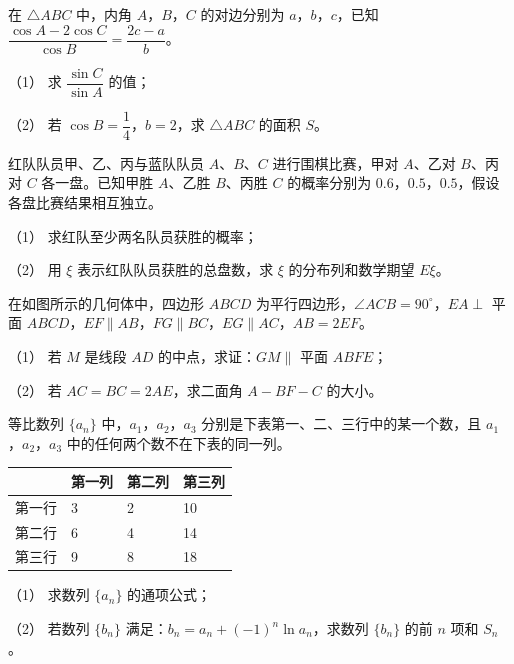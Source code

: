 \begin{question}
在 $\triangle ABC$ 中，内角 $A$，$B$，$C$ 的对边分别为 $a$，$b$，$c$，已知 $\dfrac{\cos A-2\cos C}{\cos B}=\dfrac{2c-a}{b}$。

（1） 求 $\dfrac{\sin C}{\sin A}$ 的值；

（2） 若 $\cos B=\dfrac14$，$b=2$，求 $\triangle ABC$ 的面积 $S$。

\end{question}
\begin{question}
红队队员甲、乙、丙与蓝队队员 $A$、$B$、$C$ 进行围棋比赛，甲对 $A$、乙对 $B$、丙对 $C$ 各一盘。已知甲胜 $A$、乙胜 $B$、丙胜 $C$ 的概率分别为 $0.6$，$0.5$，$0.5$，假设各盘比赛结果相互独立。

（1） 求红队至少两名队员获胜的概率；

（2） 用 $\xi$ 表示红队队员获胜的总盘数，求 $\xi$ 的分布列和数学期望 $E\xi$。

\Needspace{0.4\textheight}
\end{question}
\begin{question}
在如图所示的几何体中，四边形 $ABCD$ 为平行四边形，$\angle ACB=90^\circ$，$EA\perp$ 平面 $ABCD$，$EF\parallel AB$，$FG\parallel BC$，$EG\parallel AC$，$AB=2EF$。

（1） 若 $M$ 是线段 $AD$ 的中点，求证：$GM\parallel$ 平面 $ABFE$；

（2） 若 $AC=BC=2AE$，求二面角 $A-BF-C$ 的大小。
\nopagebreak[4]
\begin{center}\end{center}
\nopagebreak[4]
\end{question}
\begin{question}
等比数列 $\{a_n\}$ 中，$a_1$，$a_2$，$a_3$ 分别是下表第一、二、三行中的某一个数，且 $a_1$，$a_2$，$a_3$ 中的任何两个数不在下表的同一列。

\begin{center}
\begin{tabular}{llll}
\toprule
 & 第一列 & 第二列 & 第三列 \\
\midrule
第一行 & 3 & 2 & 10 \\
第二行 & 6 & 4 & 14 \\
第三行 & 9 & 8 & 18 \\
\bottomrule
\end{tabular}
\end{center}

（1） 求数列 $\{a_n\}$ 的通项公式；

（2） 若数列 $\{b_n\}$ 满足：$b_n=a_n+(-1)^n\ln a_n$，求数列 $\{b_n\}$ 的前 $n$ 项和 $S_n$。

\Needspace{0.4\textheight}
\end{question}
